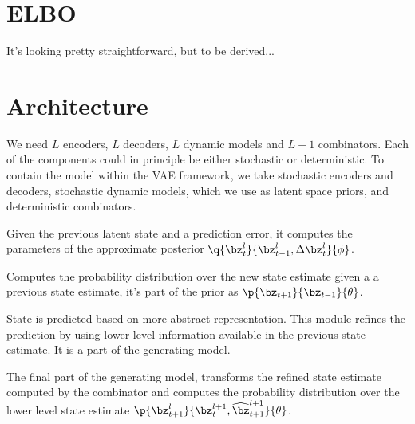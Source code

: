 \documentclass[]{article}
\begin{document}
\section{ELBO}
	
	It's looking pretty straightforward, but to be derived...
	
\section{Architecture}

	We need $L$ encoders, $L$ decoders, $L$ dynamic models and $L-1$ combinators. Each of the components could in principle be either stochastic or deterministic. To contain the model within the VAE framework, we take stochastic encoders and decoders, stochastic dynamic models, which we use as latent space priors, and deterministic combinators. 
	\begin{description}[leftmargin=\parindent]
		\item[encoder] Given the previous latent state and a prediction error, it computes the parameters of the approximate posterior $\q{\bz_t^l}{\bz_{t-1}^l, \Delta \bz_t^l}{\phi}$.
		\item[dynamic model] Computes the probability distribution over the new state estimate given a a previous state estimate, it's part of the prior as $\p{\bz_{t+1}}{\bz_{t-1}}{\theta}$.
		\item[combinator] State is predicted based on more abstract representation. This module refines the prediction by using lower-level information available in the previous state estimate. It is a part of the generating model.
		\item[decoder] The final part of the generating model, transforms the refined state estimate computed by the combinator and computes the probability distribution over the lower level state estimate $\p{\bz_{t+1}^l}{ \bz_{t}^{l+1}, \widehat{\bz}_{t+1}^{l+1} }{\theta}$.
	\end{description}
\end{document}
